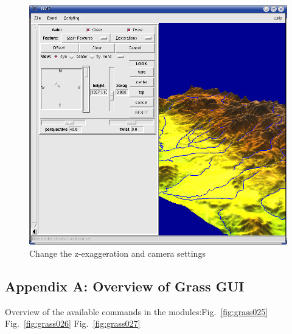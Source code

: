 \begin{figure}[htbp]
   \centering
   \includegraphics[scale=0.2]{nviz012.png}
   \caption{Change the z-exaggeration and camera settings}
   \label{fig:nviz012}
\end{figure}

\newpage
\subsection{Appendix A: Overview of Grass GUI}
\label{appendixA}

Overview of the available commands in the modules:Fig.~\ref{fig:grass025} Fig.~\ref{fig:grass026} Fig.~\ref{fig:grass027}

